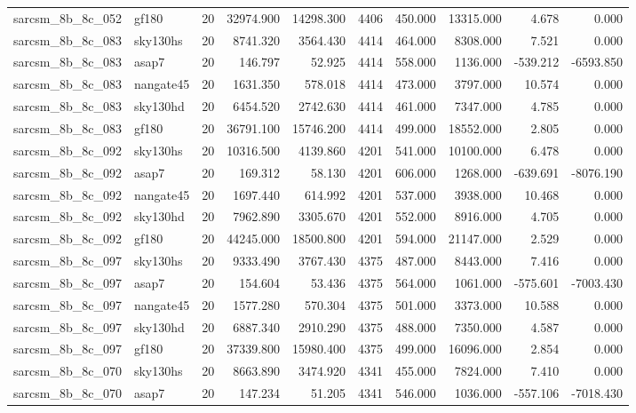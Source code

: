 \begin{tabular}{llrrrrrrrr}
sarcsm\_8b\_8c\_052 & gf180 & 20 & 32974.900 & 14298.300 & 4406 & 450.000 & 13315.000 & 4.678 & 0.000 \\
sarcsm\_8b\_8c\_083 & sky130hs & 20 & 8741.320 & 3564.430 & 4414 & 464.000 & 8308.000 & 7.521 & 0.000 \\
sarcsm\_8b\_8c\_083 & asap7 & 20 & 146.797 & 52.925 & 4414 & 558.000 & 1136.000 & -539.212 & -6593.850 \\
sarcsm\_8b\_8c\_083 & nangate45 & 20 & 1631.350 & 578.018 & 4414 & 473.000 & 3797.000 & 10.574 & 0.000 \\
sarcsm\_8b\_8c\_083 & sky130hd & 20 & 6454.520 & 2742.630 & 4414 & 461.000 & 7347.000 & 4.785 & 0.000 \\
sarcsm\_8b\_8c\_083 & gf180 & 20 & 36791.100 & 15746.200 & 4414 & 499.000 & 18552.000 & 2.805 & 0.000 \\
sarcsm\_8b\_8c\_092 & sky130hs & 20 & 10316.500 & 4139.860 & 4201 & 541.000 & 10100.000 & 6.478 & 0.000 \\
sarcsm\_8b\_8c\_092 & asap7 & 20 & 169.312 & 58.130 & 4201 & 606.000 & 1268.000 & -639.691 & -8076.190 \\
sarcsm\_8b\_8c\_092 & nangate45 & 20 & 1697.440 & 614.992 & 4201 & 537.000 & 3938.000 & 10.468 & 0.000 \\
sarcsm\_8b\_8c\_092 & sky130hd & 20 & 7962.890 & 3305.670 & 4201 & 552.000 & 8916.000 & 4.705 & 0.000 \\
sarcsm\_8b\_8c\_092 & gf180 & 20 & 44245.000 & 18500.800 & 4201 & 594.000 & 21147.000 & 2.529 & 0.000 \\
sarcsm\_8b\_8c\_097 & sky130hs & 20 & 9333.490 & 3767.430 & 4375 & 487.000 & 8443.000 & 7.416 & 0.000 \\
sarcsm\_8b\_8c\_097 & asap7 & 20 & 154.604 & 53.436 & 4375 & 564.000 & 1061.000 & -575.601 & -7003.430 \\
sarcsm\_8b\_8c\_097 & nangate45 & 20 & 1577.280 & 570.304 & 4375 & 501.000 & 3373.000 & 10.588 & 0.000 \\
sarcsm\_8b\_8c\_097 & sky130hd & 20 & 6887.340 & 2910.290 & 4375 & 488.000 & 7350.000 & 4.587 & 0.000 \\
sarcsm\_8b\_8c\_097 & gf180 & 20 & 37339.800 & 15980.400 & 4375 & 499.000 & 16096.000 & 2.854 & 0.000 \\
sarcsm\_8b\_8c\_070 & sky130hs & 20 & 8663.890 & 3474.920 & 4341 & 455.000 & 7824.000 & 7.410 & 0.000 \\
sarcsm\_8b\_8c\_070 & asap7 & 20 & 147.234 & 51.205 & 4341 & 546.000 & 1036.000 & -557.106 & -7018.430 \\

\end{tabular}
